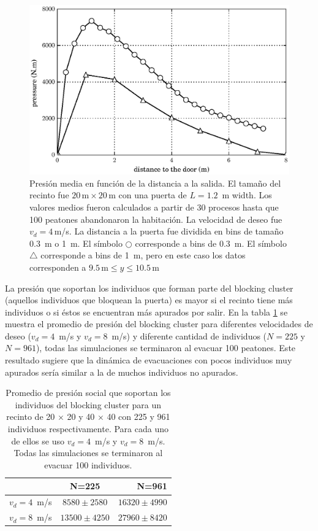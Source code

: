 \begin{figure}[H]
    \centering
    \includegraphics[scale=0.8]{figuras/p_dist.eps}
    \caption[width=5cm]{Presión media en función de la distancia a la salida. El tamaño del recinto fue $20\,\mathrm{m}\times20\,\mathrm{m}$  con una puerta de $L=1.2$~m width. Los valores medios fueron calculados a partir de 30 procesos hasta que 100 peatones abandonaron la habitación. La velocidad de deseo fue $v_d=4\,$m/s. La distancia a la puerta fue dividida en bins de tamaño $0.3$~m o 1~m.  El símbolo $\bigcirc$  corresponde a bins de $0.3$~m. El símbolo $\bigtriangleup$ corresponde a bins de 1~m, pero en este caso los datos corresponden a  $9.5\,\mathrm{m}\leq y\leq 10.5\,\mathrm{m}$ }
    \label{fis_g}
\end{figure}

La presión que soportan los individuos que forman parte del blocking cluster (aquellos individuos que bloquean la puerta) es mayor si el recinto tiene más individuos o si éstos se encuentran más apurados por salir. En la tabla \ref{tabla_p}  se muestra el promedio de presión del blocking cluster para diferentes velocidades de deseo ($v_d=4$~m/s y $v_d=8$~m/s) y diferente cantidad de individuos ($N=225$ y $N=961$), todas las simulaciones se terminaron al evacuar 100 peatones. Este resultado sugiere que la dinámica de evacuaciones con pocos individuos muy apurados sería similar a la de muchos individuos no apurados.

\begin{table}[H]
\begin{center}
   \begin{tabular}{| l | c | r | }
     \hline
      & N=225 & N=961 \\ \hline
     $v_d = 4$~m/s & $8580 \pm 2580$   & $16320 \pm 4990$ \\ \hline
     $v_d = 8$~m/s & $13500 \pm 4250$  & $27960 \pm 8420$  \\
     \hline
   \end{tabular}
 \end{center}
   \caption[width=5cm]{Promedio de presión social que soportan los individuos del blocking cluster para un recinto de 20 $\times$ 20 y 40 $\times$ 40 con 225 y 961 individuos respectivamente. Para cada uno de ellos se uso $v_d=4$~m/s y $v_d=8$~m/s. Todas las simulaciones se terminaron al evacuar 100 individuos.}
   \label{tabla_p}
   \end{table}   
   
